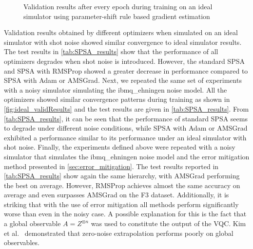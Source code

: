 \begin{figure}[htbp!]
    \centering
     \caption{Validation results after every epoch during training on an ideal simulator using parameter-shift rule based gradient estimation}
    \label{fig:param_validResults}
\end{figure}

Validation results obtained by different optimizers when simulated on an ideal simulator with shot noise showed similar convergence to ideal simulator results. The test results in \cref{tab:SPSA_results} show that the performance of all optimizers degrades when shot noise is introduced. However, the standard SPSA and SPSA with RMSProp showed a greater decrease in performance compared to SPSA with Adam or AMSGrad. Next, we repeated the same set of experiments with a noisy simulator simulating the ibmq\_ehningen noise model. All the optimizers showed similar convergence patterns during training as shown in \cref{fig:ideal_validResults} and the test results are given in \cref{tab:SPSA_results}. From \cref{tab:SPSA_results}, it can be seen that the performance of standard SPSA seems to degrade under different noise conditions, while SPSA with Adam or AMSGrad exhibited a performance similar to its performance under an ideal simulator with shot noise. Finally, the experiments defined above were repeated with a noisy simulator that simulates the ibmq\_ehningen noise model and the error mitigation method presented in \cref{sec:error_mitigation}. The test results reported in \cref{tab:SPSA_results} show again the same hierarchy, with AMSGrad performing the best on average. However, RMSProp achieves almost the same accuracy on average and even surpasses AMSGrad on the F3 dataset. Additionally, it is striking that with the use of error mitigation all methods perform significantly worse than even in the noisy case. A possible explanation for this is the fact that a global observable \(A = Z^{\otimes n }\) was used to constitute the output of the VQC. Kim et al.~\cite{kim2023scalable} demonstrated that zero-noise extrapolation performs poorly on global observables.


